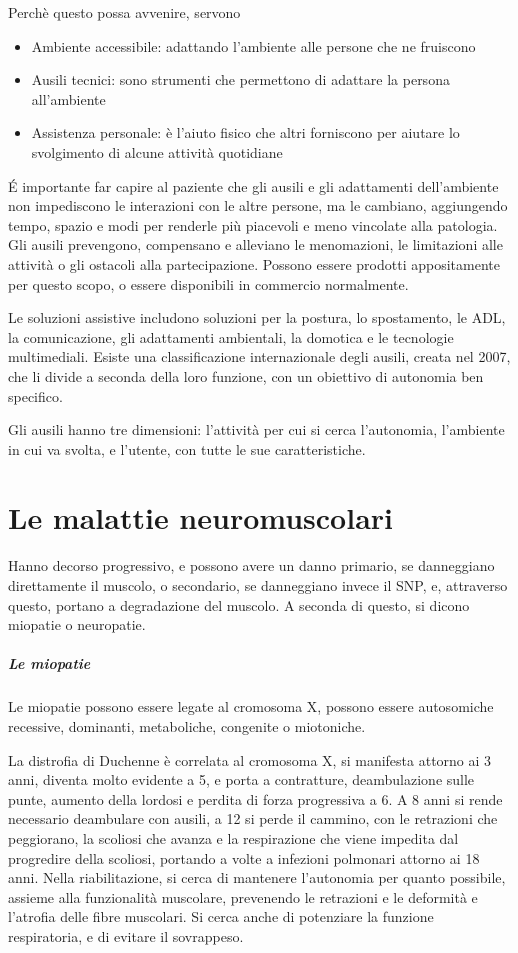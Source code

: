 Perchè questo possa avvenire, servono
\begin{itemize}
\item Ambiente accessibile: adattando l'ambiente alle persone che ne fruiscono
\item Ausili tecnici: sono strumenti che permettono di adattare la persona all'ambiente
\item Assistenza personale: è l'aiuto fisico che altri forniscono per aiutare lo svolgimento di alcune attività quotidiane
\end{itemize}

\'E importante far capire al paziente che gli ausili e gli adattamenti dell'ambiente non impediscono le interazioni con le altre
persone, ma le cambiano, aggiungendo tempo, spazio e modi per renderle più piacevoli e meno vincolate alla patologia.
Gli ausili prevengono, compensano e alleviano le menomazioni, le limitazioni alle attività o gli ostacoli alla partecipazione. Possono
essere prodotti appositamente per questo scopo, o essere disponibili in commercio normalmente.

Le soluzioni assistive includono soluzioni per la postura, lo spostamento, le ADL, la comunicazione, gli adattamenti ambientali, la
domotica e le tecnologie multimediali. Esiste una classificazione internazionale degli ausili, creata nel 2007, che li divide a seconda
della loro funzione, con un obiettivo di autonomia ben specifico.

Gli ausili hanno tre dimensioni: l'attività per cui si cerca l'autonomia, l'ambiente in cui va svolta, e l'utente, con tutte le sue
caratteristiche.

\chapter {Le malattie neuromuscolari}
Hanno decorso progressivo, e possono avere un danno primario, se danneggiano direttamente il muscolo, o secondario, se danneggiano
invece il SNP, e, attraverso questo, portano a degradazione del muscolo. A seconda di questo, si dicono miopatie o neuropatie.

\paragraph{Le miopatie}
Le miopatie possono essere legate al cromosoma X, possono essere autosomiche recessive, dominanti, metaboliche, congenite o miotoniche.

La distrofia di Duchenne è correlata al cromosoma X, si manifesta attorno ai 3 anni, diventa molto evidente a 5, e porta a contratture,
deambulazione sulle punte, aumento della lordosi e perdita di forza progressiva a 6. A 8 anni si rende necessario deambulare con ausili,
a 12 si perde il cammino, con le retrazioni che peggiorano, la scoliosi che avanza e la respirazione che viene impedita dal progredire
della scoliosi, portando a volte a infezioni polmonari attorno ai 18 anni. Nella riabilitazione, si cerca di mantenere l'autonomia per
quanto possibile, assieme alla funzionalità muscolare, prevenendo le retrazioni e le deformità e l'atrofia delle fibre muscolari. Si
cerca anche di potenziare la funzione respiratoria, e di evitare il sovrappeso.

